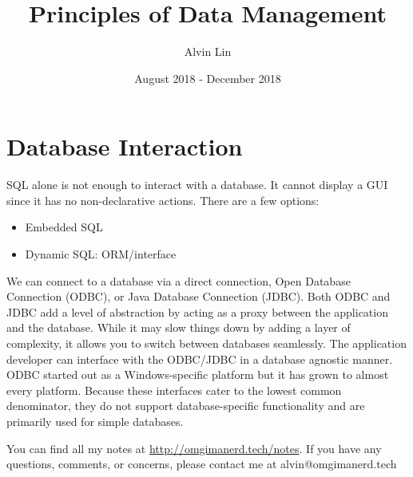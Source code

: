 \documentclass{math}
\title{Principles of Data Management}
\author{Alvin Lin}
\date{August 2018 - December 2018}
\begin{document}
\maketitle

\section*{Database Interaction}
SQL alone is not enough to interact with a database. It cannot display a GUI
since it has no non-declarative actions. There are a few options:
\begin{itemize}
  \item Embedded SQL
  \item Dynamic SQL: ORM/interface
\end{itemize}
We can connect to a database via a direct connection, Open Database Connection
(ODBC), or Java Database Connection (JDBC). Both ODBC and JDBC add a level of
abstraction by acting as a proxy between the application and the database.
While it may slow things down by adding a layer of complexity, it allows you to
switch between databases seamlessly. The application developer can interface
with the ODBC/JDBC in a database agnostic manner. ODBC started out as a
Windows-specific platform but it has grown to almost every platform. Because
these interfaces cater to the lowest common denominator, they do not support
database-specific functionality and are primarily used for simple databases.


\begin{center}
  You can find all my notes at \url{http://omgimanerd.tech/notes}. If you have
  any questions, comments, or concerns, please contact me at
  alvin@omgimanerd.tech
\end{center}
\end{document}
